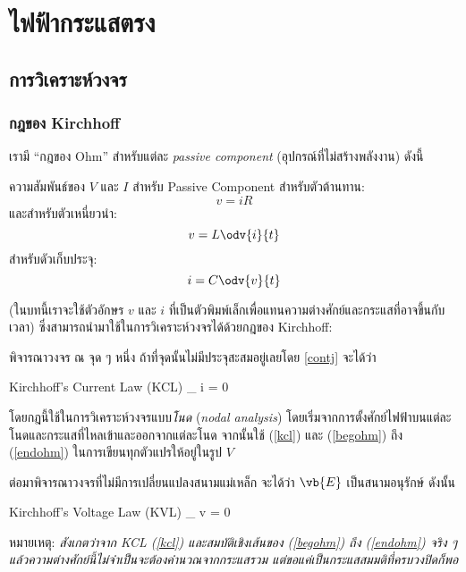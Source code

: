 \chapter{ไฟฟ้ากระแสตรง}
\section{การวิเคราะห์วงจร}

\subsection{กฎของ Kirchhoff}

เรามี ``กฎของ Ohm'' สำหรับแต่ละ \emph{passive component} (อุปกรณ์ที่ไม่สร้างพลังงาน) ดังนี้
\begin{lawbox}{ความสัมพันธ์ของ $V$ และ $I$ สำหรับ Passive Component}
    สำหรับตัวต้านทาน:
    \begin{equation}
        v = iR
    \end{equation}
    และสำหรับตัวเหนี่ยวนำ:
    \begin{equation}
        v = L\odv{i}{t} \label{endohm}
    \end{equation}
    สำหรับดัวเก็บประจุ:
    \begin{equation}
        i = C\odv{v}{t} \label{begohm}
    \end{equation}
\end{lawbox}
(ในบทนี้เราจะใช้ตัวอักษร $v$ และ $i$ ที่เป็นตัวพิมพ์เล็กเพื่อแทนความต่างศักย์และกระแสที่อาจขึ้นกับเวลา) ซึ่งสามารถนำมาใช้ในการวิเคราะห์วงจรได้ด้วยกฎของ Kirchhoff:

พิจารณาวงจร ณ จุด ๆ หนึ่ง ถ้าที่จุดนั้นไม่มีประจุสะสมอยู่เลยโดย \ref{contj} จะได้ว่า
\begin{ieqbox}{Kirchhoff's Current Law (KCL)}
    \sum_ i = 0\label{kcl}
\end{ieqbox}

โดยกฎนี้ใช้ในการวิเคราะห์วงจรแบบ\emph{โนด} (\emph{nodal analysis}) โดยเริ่มจากการตั้งศักย์ไฟฟ้าบนแต่ละโนดและกระแสที่ไหลเข้าและออกจากแต่ละโนด จากนั้นใช้ (\ref{kcl}) และ (\ref{begohm}) ถึง (\ref{endohm}) ในการเขียนทุกตัวแปรให้อยู่ในรูป $V$

ต่อมาพิจารณาวงจรที่ไม่มีการเปลี่ยนแปลงสนามแม่เหล็ก จะได้ว่า $\vb{E}$ เป็นสนามอนุรักษ์ ดังนั้น
\begin{ieqbox}{Kirchhoff's Voltage Law (KVL)}
    \sum_ v = 0\label{kvl}
\end{ieqbox}
หมายเหตุ: \emph{สังเกตว่าจาก KCL (\ref{kcl}) และสมบัติเชิงเส้นของ (\ref{begohm}) ถึง (\ref{endohm}) จริง ๆ แล้วความต่างศักย์นี้ไม่จำเป็นจะต้องคำนวณจากกระแสรวม แต่ขอแค่เป็นกระแสสมมติที่ครบวงปิดก็พอ}

